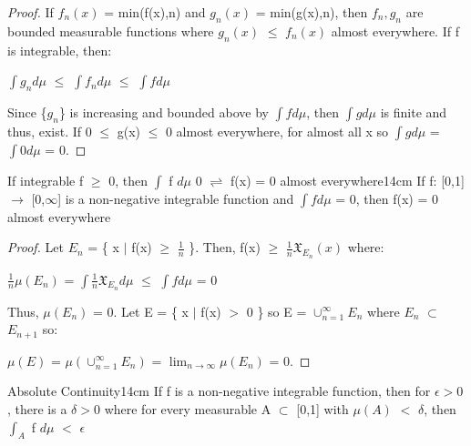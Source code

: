     \begin{proof}
        If $f_n(x)$ = min(f(x),n) and $g_n(x)$ = min(g(x),n),
        then $f_n,g_n$ are bounded measurable functions
        where $g_n(x)$ $\leq$ $f_n(x)$ almost everywhere.
        If f is integrable, then:

        \hspace{0.5cm}
        $\int g_n d\mu$
        $\leq$ $\int f_n d\mu$
        $\leq$ $\int f d\mu$

        Since \{$g_n$\} is increasing and bounded above by $\int f d\mu$,
        then $\int g d\mu$ is finite and thus, exist.
        If 0 $\leq$ g(x) $\leq$ 0 almost everywhere,
        for almost all x so $\int g d\mu$ = $\int 0 d\mu$ = 0.
    \end{proof}

    \vspace{0.5cm}



    \begin{corollary}{If integrable f $\geq$ 0, then
    $\int$ f $d\mu$ 0 $\rightleftharpoons$ f(x) = 0 almost everywhere}{14cm}
        If f: [0,1] $\rightarrow$ [0,$\infty$] is a non-negative integrable
        function and $\int f d\mu$ = 0, then f(x) = 0 almost everywhere
    \end{corollary}

    \begin{proof}
        Let $E_n$ = \{ x $|$ f(x) $\geq$ $\frac{1}{n}$ \}.
        Then, f(x) $\geq$ $\frac{1}{n} \mathfrak{X}_{E_n}(x)$ where:

        \hspace{0.5cm}
        $\frac{1}{n} \mu(E_n)$
        = $\int \frac{1}{n} \mathfrak{X}_{E_n} d\mu$
        $\leq$ $\int f d\mu$
        = 0

        Thus, $\mu(E_n)$ = 0.
        Let E = \{ x $|$ f(x) $>$ 0 \}
        so E = $\cup_{n=1}^{\infty} E_n$ where $E_n$ $\subset$ $E_{n+1}$ so:

        \hspace{0.5cm}
        $\mu(E)$
        = $\mu(\cup_{n=1}^{\infty} E_n)$
        = $\lim_{n \rightarrow \infty} \mu(E_n)$
        = 0.
    \end{proof}

    \newpage



    \begin{wtheorem}{Absolute Continuity}{14cm}
        If f is a non-negative integrable function, then for $\epsilon > 0$,
        there is a $\delta > 0$ where for every measurable A $\subset$ [0,1]
        with $\mu(A)$ $<$ $\delta$, then $\int_A$ f $d\mu$ $<$ $\epsilon$
    \end{wtheorem}

